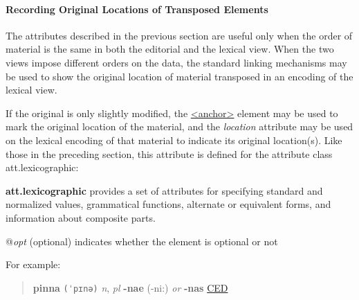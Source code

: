\paragraph[{Recording Original Locations of Transposed Elements}]{Recording Original Locations of Transposed Elements}\label{DIMVOL}\par
The attributes described in the previous section are useful only when the order of material is the same in both the editorial and the lexical view. When the two views impose different orders on the data, the standard linking mechanisms may be used to show the original location of material transposed in an encoding of the lexical view. \par
If the original is only slightly modified, the \hyperref[TEI.anchor]{<anchor>} element may be used to mark the original location of the material, and the {\itshape location} attribute may be used on the lexical encoding of that material to indicate its original location(s). Like those in the preceding section, this attribute is defined for the attribute class \textsf{att.lexicographic}:
\begin{sansreflist}
  
\item [\textbf{att.lexicographic}] provides a set of attributes for specifying standard and normalized values, grammatical functions, alternate or equivalent forms, and information about composite parts.\hfil\\[-10pt]\begin{sansreflist}
    \item[@{\itshape opt}]
  (optional) indicates whether the element is optional or not
\end{sansreflist}  
\end{sansreflist}
\par
For example:
\begin{quote}{\bfseries pinna} \texttt{(ˈpɪnə)} {\itshape n}, {\itshape pl} {\bfseries -nae} (-ni:) {\itshape or} {\bfseries -nas} \hyperref[DIC-CED]{CED}\end{quote}
